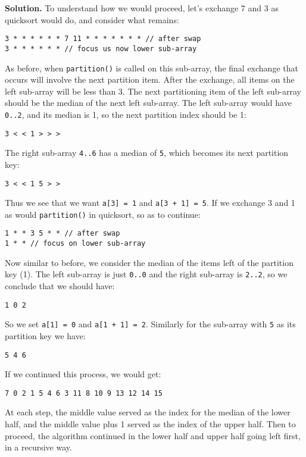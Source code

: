 \documentclass[12pt, a4paper]{article}
\newenvironment{sol}[1][Solution]
{\par\medskip\noindent \textbf{#1.} }
{\medskip}
\begin{document}
\begin{sol}
		To understand how we would proceed, let's exchange 7 and 3 as quicksort would do,
		and consider what remains:
		\begin{lstlisting}[language={}]
3 * * * * * * 7 11 * * * * * * * // after swap
3 * * * * * * // focus us now lower sub-array
		\end{lstlisting}
		As before, when \texttt{partition()} is called on this sub-array, the
		final exchange that occurs will involve the next partition item. After
		the exchange, all items on the left sub-array will be less than 3.
		The next partitioning item of the left sub-array should be the median
		of the next left sub-array. The left sub-array would have \texttt{0..2},
		and its median is 1, so the next partition index should be 1:
		\begin{lstlisting}[language={}]
3 < < 1 > > >
		\end{lstlisting}
		The right sub-array \texttt{4..6} has a median of \texttt{5}, which
		becomes its next partition key:
		\begin{lstlisting}[language={}]
3 < < 1 5 > >
		\end{lstlisting}
		Thus we see that we want \texttt{a[3] = 1} and \texttt{a[3 + 1] = 5}. If we exchange
		3 and 1 as would \texttt{partition()} in quicksort, so as to continue:
		\begin{lstlisting}[language={}]
1 * * 3 5 * * // after swap
1 * * // focus on lower sub-array
		\end{lstlisting}
		Now similar to before, we consider the median of the items left of the
		partition key (1). The left sub-array is just \texttt{0..0} and the
		right sub-array is \texttt{2..2}, so we conclude that we should have:
		\begin{lstlisting}[language={}]
1 0 2
		\end{lstlisting}
		So we set \texttt{a[1] = 0} and \texttt{a[1 + 1] = 2}. Similarly for the
		sub-array with \texttt{5} as its partition key we have:
		\begin{lstlisting}[language={}]
5 4 6
		\end{lstlisting}
		If we continued this process, we would get:
		\begin{lstlisting}[language={}]
7 0 2 1 5 4 6 3 11 8 10 9 13 12 14 15
		\end{lstlisting}
		At each step, the middle value served as the index for the median
		of the lower half, and the middle value plus 1 served as the index of
		the upper half. Then to proceed, the algorithm continued in the lower
		half and upper half going left first, in a recursive way.
		

\end{sol}
\end{document}
